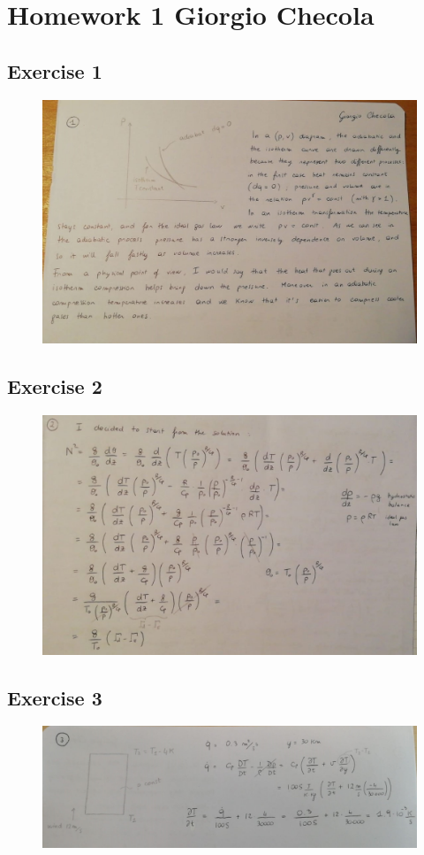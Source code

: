 \documentclass[11pt,a4paper]{article}
\begin{document}
	
\section*{Homework 1  \hfill Giorgio Checola}
\subsection{Exercise 1}
\begin{figure}[H]
\centering \includegraphics[width=150mm]{images/es1.JPEG}
\end{figure}
\subsection{Exercise 2}
\begin{figure}[H]
	\centering \includegraphics[width=150mm]{images/es2.JPEG}
\end{figure}
\subsection{Exercise 3}
\begin{figure}[H]
	\centering \includegraphics[width=150mm]{images/es3.JPEG}
\end{figure}
\end{document}
